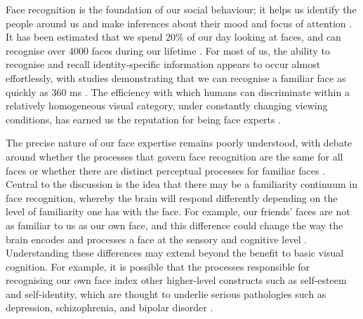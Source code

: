 \documentclass[
  10pt,
  letterpaper,
]{article}
\begin{document}
Face recognition is the foundation of our social behaviour; it helps us
identify the people around us and make inferences about their mood and
focus of attention \citep{burton2015a, mohr2018a}. It has been estimated
that we spend 20\(\%\) of our day looking at faces, and can recognise
over 4000 faces during our lifetime \citep{jenkins2018a, oruc2019a}. For
most of us, the ability to recognise and recall identity-specific
information appears to occur almost effortlessly, with studies
demonstrating that we can recognise a familiar face as quickly as 360 ms
\citep{besson2016a, blauch2021a, oruc2019a, ramon2016a}. The efficiency
with which humans can discriminate within a relatively homogeneous
visual category, under constantly changing viewing conditions, has
earned us the reputation for being face experts
\citep{collins2018a, dobs2019a, kramer2017a, quek2021a, rossion_what_2019, towler_are_2019}.

The precise nature of our face expertise remains poorly understood, with
debate around whether the processes that govern face recognition are the
same for all faces or whether there are distinct perceptual processes
for familiar faces \citep{abudarham2019a, blauch2021a, collins2018a}.
Central to the discussion is the idea that there may be a familiarity
continuum in face recognition, whereby the brain will respond
differently depending on the level of familiarity one has with the face.
For example, our friends' faces are not as familiar to us as our own
face, and this difference could change the way the brain encodes and
processes a face at the sensory and cognitive level
\citep{bortolon2018a, rooney2012a, tong1999a}. Understanding these
differences may extend beyond the benefit to basic visual cognition. For
example, it is possible that the processes responsible for recognising
our own face index other higher-level constructs such as self-esteem and
self-identity, which are thought to underlie serious pathologies such as
depression, schizophrenia, and bipolar disorder
\citep{felisberti2014a, oliveira2015a}.
\end{document}
